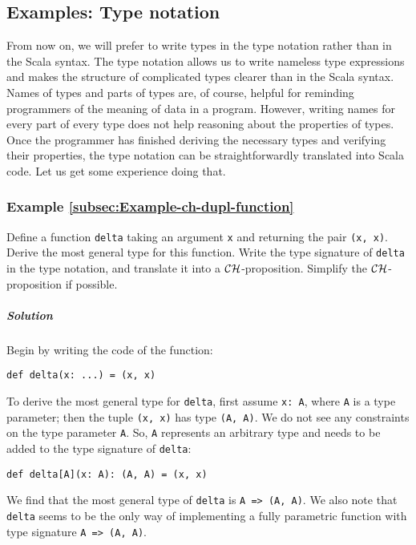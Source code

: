 \subsection{Examples: Type notation}

From now on, we will prefer to write types in the type notation rather
than in the Scala syntax. The type notation allows us to write nameless
type expressions and makes the structure of complicated types clearer
than in the Scala syntax. Names of types and parts of types are, of
course, helpful for reminding programmers of the meaning of data in
a program. However, writing names for every part of every type does
not help reasoning about the properties of types. Once the programmer
has finished deriving the necessary types and verifying their properties,
the type notation can be straightforwardly translated into Scala code.
Let us get some experience doing that.

\subsubsection{Example \label{subsec:Example-ch-dupl-function}\ref{subsec:Example-ch-dupl-function}}

Define a function \lstinline!delta! taking an argument \lstinline!x!
and returning the pair \lstinline!(x, x)!. Derive the most general
type for this function. Write the type signature of \lstinline!delta!
in the type notation, and translate it into a ${\cal CH}$-proposition.
Simplify the ${\cal CH}$-proposition if possible.

\subparagraph{Solution}

Begin by writing the code of the function:
\begin{lstlisting}
def delta(x: ...) = (x, x)
\end{lstlisting}
To derive the most general type for \lstinline!delta!, first assume
\lstinline!x: A!, where \lstinline!A! is a type parameter; then
the tuple \lstinline!(x, x)! has type \lstinline!(A, A)!. We do
not see any constraints on the type parameter \lstinline!A!. So,
\lstinline!A! represents an arbitrary type and needs to be added
to the type signature of \lstinline!delta!:
\begin{lstlisting}
def delta[A](x: A): (A, A) = (x, x)
\end{lstlisting}
We find that the most general type of \lstinline!delta! is \lstinline!A => (A, A)!.
We also note that \lstinline!delta! seems to be the only way of implementing
a fully parametric function with type signature \lstinline!A => (A, A)!.


